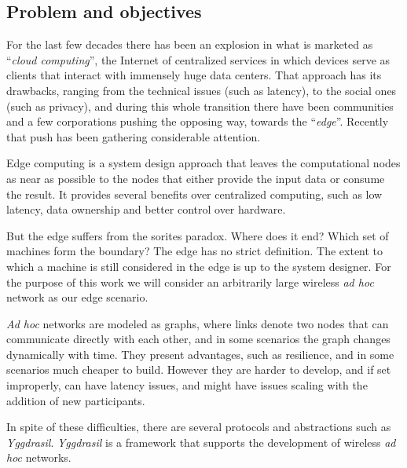 \documentclass[runningheads]{../llncs}
\begin{document}
\subsection*{Problem and objectives}
For the last few decades there has been an explosion in what is marketed as ``\textit{cloud computing}''\cite{Gartner:2017}, the Internet of centralized services in which devices serve as clients that interact with immensely huge data centers.
That approach has its drawbacks, ranging from the technical issues (such as latency), to the social ones (such as privacy), and during this whole transition there have been communities and a few corporations pushing the opposing way, towards the ``\textit{edge}''\cite{Satyanarayanan:2017}. Recently that push has been gathering considerable attention.
\par Edge computing is a system design approach that leaves the computational nodes as near as possible to the nodes that either provide the input data or consume the result.
It provides several benefits over centralized computing, such as low latency, data ownership and better control over hardware.
\par But the edge suffers from the sorites paradox\cite{Leitao:2018}. Where does it end? Which set of machines form the boundary?
The edge has no strict definition. The extent to which a machine is still considered in the edge is up to the system designer. For the purpose of this work we will consider an arbitrarily large wireless \textit{ad hoc} network as our edge scenario.
\par \textit{Ad hoc} networks are modeled as graphs, where links denote two nodes that can communicate directly with each other, and in some scenarios the graph changes dynamically with time\cite{Akos:2018}. They present advantages, such as resilience, and in some scenarios  much cheaper to build. However they are harder to develop, and if set improperly, can have latency issues, and might have issues scaling with the addition of new participants. 
\par In spite of these difficulties, there are several protocols and abstractions such as \textit{Yggdrasil}\cite{Akos:2018}. \textit{Yggdrasil} is a framework that supports the development of wireless \textit{ad hoc} networks.
\end{document}
